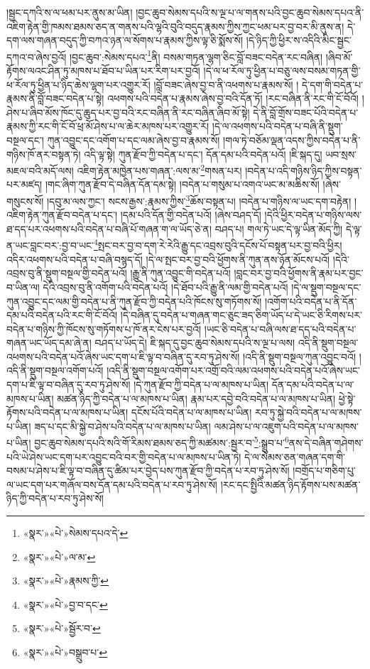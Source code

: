 །སྦྱང་དཀའི་ས་ལ་ཕམ་པར་ནུས་མ་ཡིན། །བྱང་ཆུབ་སེམས་དཔའི་ས་ལྔ་པ་ལ་གནས་པའི་བྱང་ཆུབ་སེམས་དཔའ་ནི་འཇིག་རྟེན་གྱི་ཁམས་ཐམས་ཅད་ན་གནས་པའི་ལྷའི་བུའི་བདུད་རྣམས་ཀྱིས་ཀྱང་ཕམ་པར་བྱ་བར་མི་ནུས་ན། དེ་དག་ལས་གཞན་བདུད་ཀྱི་བཀའ་ཉན་ལ་སོགས་པ་རྣམས་ཀྱིས་ལྟ་ཅི་སྨོས་སོ། །དེ་ཉིད་ཀྱི་ཕྱིར་ས་འདིའི་མིང་སྦྱང་དཀའ་བ་ཞེས་བྱའོ། །བྱང་ཆུབ་:སེམས་དཔའ་\footnote{«སྣར་»«པེ་»སེམས་དཔའ་དེ་}ནི། བསམ་གཏན་ལྷག་ཅིང་བློ་བཟང་བདེན་རང་བཞིན། །ཞིབ་མོ་རྟོགས་ལའང་ཤིན་ཏུ་མཁས་པ་ཐོབ་པ་ཡིན་པར་རིག་པར་བྱའོ། །དེ་ལ་ཕ་རོལ་ཏུ་ཕྱིན་པ་བཅུ་ལས་བསམ་གཏན་གྱི་ཕ་རོལ་ཏུ་ཕྱིན་པ་ཉིད་ཆེས་ལྷག་པར་འགྱུར་རོ། །བློ་བཟང་ཞེས་བྱ་བ་ནི་འཕགས་པ་རྣམས་སོ། །
དེ་དག་གི་བདེན་པ་རྣམས་ནི་བློ་བཟང་བདེན་པ་སྟེ། འཕགས་པའི་བདེན་པ་རྣམས་ཞེས་བྱ་བའི་དོན་ཏོ། །རང་བཞིན་ནི་རང་གི་ངོ་བོའོ། །ཤེས་པ་ཞིབ་མོས་ཁོང་དུ་ཆུད་པར་བྱ་བའི་རང་བཞིན་ནི་རང་བཞིན་ཞིབ་མོ་སྟེ། དེ་ནི་བློ་གྲོས་བཟང་པོའི་བདེན་པ་རྣམས་ཀྱི་རང་གི་ངོ་བོ་ཕྲ་མོ་ཤེས་པ་ལ་ཆེར་མཁས་པར་འགྱུར་རོ། །དེ་ལ་འཕགས་པའི་བདེན་པ་བཞི་ནི་སྡུག་བསྔལ་དང་། ཀུན་འབྱུང་དང་འགོག་པ་དང་ལམ་ཞེས་བྱ་བ་རྣམས་སོ། །གལ་ཏེ་བཅོམ་ལྡན་འདས་ཀྱིས་བདེན་པ་ནི་གཉིས་ཁོ་ནར་བསྟན་ཏེ། འདི་ལྟ་སྟེ། ཀུན་རྫོབ་ཀྱི་བདེན་པ་དང་། དོན་དམ་པའི་བདེན་པའོ། །ཇི་སྐད་དུ། ཡབ་སྲས་མཇལ་བའི་མདོ་ལས། འཇིག་རྟེན་མཁྱེན་པས་གཞན་:ལས་མ་\footnote{«སྣར་»«པེ་»ལ་མ་}གསན་པར། །བདེན་པ་འདི་གཉིས་ཉིད་ཀྱིས་བསྟན་པར་མཛད། །གང་ཞིག་ཀུན་རྫོབ་དེ་བཞིན་དོན་དམ་སྟེ། །བདེན་པ་གསུམ་པ་འགའ་ཡང་མ་མཆིས་སོ། །ཞེས་གསུངས་སོ། །དབུ་མ་ལས་ཀྱང་། སངས་རྒྱས་:རྣམས་ཀྱིས་\footnote{«སྣར་»«པེ་»རྣམས་ཀྱི་}ཆོས་བསྟན་པ། །བདེན་པ་གཉིས་ལ་ཡང་དག་བརྟེན། །འཇིག་རྟེན་ཀུན་རྫོབ་བདེན་པ་དང་། །དམ་པའི་དོན་གྱི་བདེན་པའོ། །ཞེས་བཤད་དོ། །དེའི་ཕྱིར་བདེན་པ་གཉིས་ལས་ཐ་དད་པར་འཕགས་པའི་བདེན་པ་བཞི་པོ་གཞན་ག་ལ་ཡོད་ཅེ་ན། བཤད་པ། གལ་ཏེ་ཡང་དེ་ལྟ་ཡིན་མོད་ཀྱི། དེ་ལྟ་ན་ཡང་བླང་བར་:བྱ་བ་ཡང་\footnote{«སྣར་»«པེ་»བྱ་བ་དང་}སྤང་བར་བྱ་བ་དག་རེ་རེའི་རྒྱུ་དང་འབྲས་བུའི་དངོས་པོ་བསྟན་པར་བྱ་བའི་ཕྱིར། འདིར་འཕགས་པའི་བདེན་པ་བཞི་བསྙད་དོ། །དེ་ལ་སྤང་བར་བྱ་བའི་ཕྱོགས་ནི་ཀུན་ནས་ཉོན་མོངས་པའོ། །དེའི་འབྲས་བུ་ནི་སྡུག་བསྔལ་གྱི་བདེན་པའོ། །རྒྱུ་ནི་ཀུན་འབྱུང་གི་བདེན་པའོ། །བླང་བར་བྱ་བའི་ཕྱོགས་ནི་རྣམ་པར་བྱང་བ་ཡིན་ལ། དེའི་འབྲས་བུ་ནི་འགོག་པའི་བདེན་པའོ། །དེ་ཐོབ་པའི་རྒྱུ་ནི་ལམ་གྱི་བདེན་པའོ། །དེ་ལ་སྡུག་བསྔལ་དང་ཀུན་འབྱུང་དང་ལམ་གྱི་བདེན་པ་ནི་ཀུན་རྫོབ་ཀྱི་བདེན་པའི་ཁོངས་སུ་གཏོགས་སོ། །འགོག་པའི་བདེན་པ་ནི་དོན་དམ་པའི་བདེན་པའི་རང་གི་ངོ་བོའོ། །དེ་བཞིན་དུ་བདེན་པ་གཞན་གང་ཅུང་ཟད་ཅིག་ཡོད་པ་དེ་ཡང་ཅི་རིགས་པར་བདེན་པ་གཉིས་ཀྱི་ཁོངས་སུ་གཏོགས་པ་ཁོ་ནར་ངེས་པར་བྱའོ། །ཡང་ཅི་བདེན་པ་བཞི་ལས་ཐ་དད་པའི་བདེན་པ་གཞན་ཡང་ཡོད་དམ་ཞེ་ན། བཤད་པ་ཡོད་དེ། ཇི་སྐད་དུ་བྱང་ཆུབ་སེམས་དཔའི་ས་ལྔ་པ་ལས། འདི་ནི་སྡུག་བསྔལ་འཕགས་པའི་བདེན་པའོ་ཞེས་ཡང་དག་པ་ཇི་ལྟ་བ་བཞིན་དུ་རབ་ཏུ་ཤེས་སོ། །འདི་ནི་སྡུག་བསྔལ་ཀུན་འབྱུང་བའོ། །འདི་ནི་སྡུག་བསྔལ་འགོག་པའོ། །འདི་ནི་སྡུག་བསྔལ་འགོག་པར་འགྲོ་བའི་ལམ་འཕགས་པའི་བདེན་པའོ་ཞེས་ཡང་དག་པ་ཇི་ལྟ་བ་བཞིན་དུ་རབ་ཏུ་ཤེས་སོ། །དེ་ཀུན་རྫོབ་ཀྱི་བདེན་པ་ལ་མཁས་པ་ཡིན། དོན་དམ་པའི་བདེན་པ་ལ་མཁས་པ་ཡིན། མཚན་ཉིད་ཀྱི་བདེན་པ་ལ་མཁས་པ་ཡིན། རྣམ་པར་དབྱེ་བའི་བདེན་པ་ལ་མཁས་པ་ཡིན། ཕྱེ་སྟེ་རྟོགས་པའི་བདེན་པ་ལ་མཁས་པ་ཡིན། དངོས་པོའི་བདེན་པ་ལ་མཁས་པ་ཡིན། རབ་ཏུ་སྐྱེ་བའི་བདེན་པ་ལ་མཁས་པ་ཡིན། ཟད་པ་དང་མི་སྐྱེ་བ་ཤེས་པའི་བདེན་པ་ལ་མཁས་པ་ཡིན། ལམ་ཤེས་པ་ལ་འཇུག་པའི་བདེན་པ་ལ་མཁས་པ་ཡིན། བྱང་ཆུབ་སེམས་དཔའི་སའི་གོ་རིམས་ཐམས་ཅད་ཀྱི་མཚམས་:སྦྱར་བ་\footnote{«སྣར་»«པེ་»སྦྱོར་བ་}:སྒྲུབ་པ་\footnote{«སྣར་»«པེ་»བསྒྲུབ་པ་}ནས་དེ་བཞིན་གཤེགས་པའི་ཡེ་ཤེས་ཡང་དག་པར་འབྱུང་བའི་བར་གྱི་བདེན་པ་ལ་མཁས་པ་ཡིན་ཏེ། དེ་ལ་སེམས་ཅན་གཞན་དག་གི་བསམ་པ་ཤེས་པ་ཇི་ལྟ་བ་བཞིན་དུ་ཚིམ་པར་བྱེད་པས་ཀུན་རྫོབ་ཀྱི་བདེན་པ་རབ་ཏུ་ཤེས་སོ། །བགྲོད་པ་གཅིག་པུ་ལ་ཡང་དག་པར་གཞོལ་བས་དོན་དམ་པའི་བདེན་པ་རབ་ཏུ་ཤེས་སོ། །རང་དང་སྤྱིའི་མཚན་ཉིད་རྟོགས་པས་མཚན་ཉིད་ཀྱི་བདེན་པ་རབ་ཏུ་ཤེས་སོ། 